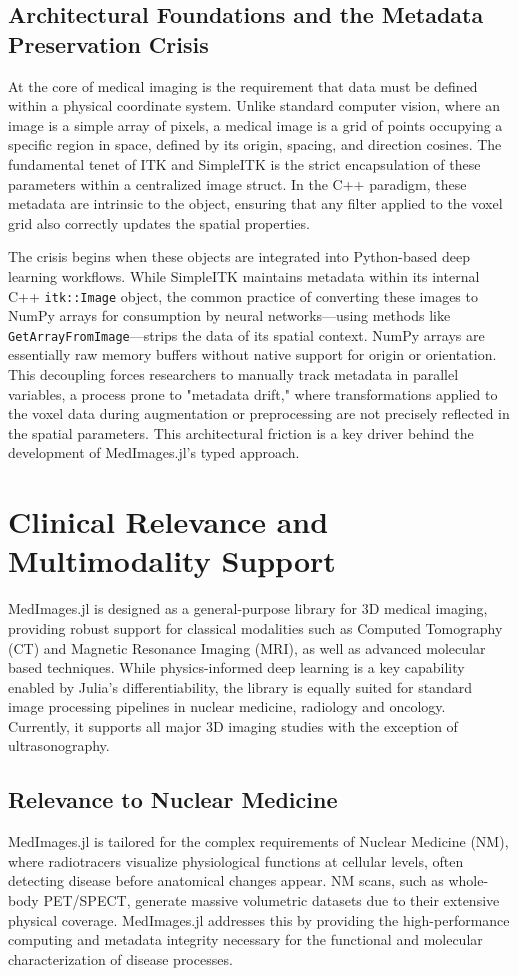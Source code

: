 \documentclass[10pt,letterpaper]{article}
\begin{document}
\subsection*{Architectural Foundations and the Metadata Preservation Crisis}
At the core of medical imaging is the requirement that data must be defined within a physical coordinate system. Unlike standard computer vision, where an image is a simple array of pixels, a medical image is a grid of points occupying a specific region in space, defined by its origin, spacing, and direction cosines. The fundamental tenet of ITK and SimpleITK is the strict encapsulation of these parameters within a centralized image struct. In the C++ paradigm, these metadata are intrinsic to the object, ensuring that any filter applied to the voxel grid also correctly updates the spatial properties.

The crisis begins when these objects are integrated into Python-based deep learning workflows. While SimpleITK maintains metadata within its internal C++ \texttt{itk::Image} object, the common practice of converting these images to NumPy arrays for consumption by neural networks---using methods like \texttt{GetArrayFromImage}---strips the data of its spatial context. NumPy arrays are essentially raw memory buffers without native support for origin or orientation. This decoupling forces researchers to manually track metadata in parallel variables, a process prone to "metadata drift," where transformations applied to the voxel data during augmentation or preprocessing are not precisely reflected in the spatial parameters. This architectural friction is a key driver behind the development of MedImages.jl's typed approach.

\section*{Clinical Relevance and Multimodality Support}
MedImages.jl is designed as a general-purpose library for 3D medical imaging, providing robust support for classical modalities such as Computed Tomography (CT) and Magnetic Resonance Imaging (MRI), as well as advanced molecular based techniques. While physics-informed deep learning is a key capability enabled by Julia's differentiability, the library is equally suited for standard image processing pipelines in nuclear medicine, radiology and oncology. Currently, it supports all major 3D imaging studies with the exception of ultrasonography.

\subsection*{Relevance to Nuclear Medicine}
MedImages.jl is tailored for the complex requirements of Nuclear Medicine (NM), where radiotracers visualize physiological functions at cellular levels, often detecting disease before anatomical changes appear. NM scans, such as whole-body PET/SPECT, generate massive volumetric datasets due to their extensive physical coverage. MedImages.jl addresses this by providing the high-performance computing and metadata integrity necessary for the functional and molecular characterization of disease processes.
\end{document}

